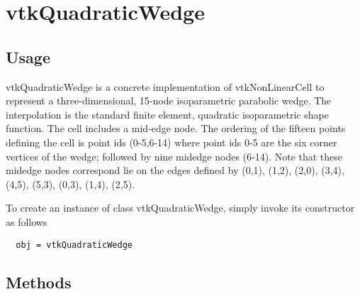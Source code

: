 \section{vtkQuadraticWedge}

\subsection{Usage}

 vtkQuadraticWedge is a concrete implementation of vtkNonLinearCell to
 represent a three-dimensional, 15-node isoparametric parabolic
 wedge. The interpolation is the standard finite element, quadratic
 isoparametric shape function. The cell includes a mid-edge node. The
 ordering of the fifteen points defining the cell is point ids (0-5,6-14)
 where point ids 0-5 are the six corner vertices of the wedge; followed by
 nine midedge nodes (6-14). Note that these midedge nodes correspond lie
 on the edges defined by (0,1), (1,2), (2,0), (3,4), (4,5), (5,3), (0,3),
 (1,4), (2,5).

To create an instance of class vtkQuadraticWedge, simply
invoke its constructor as follows
\begin{verbatim}
  obj = vtkQuadraticWedge
\end{verbatim}
\subsection{Methods}

